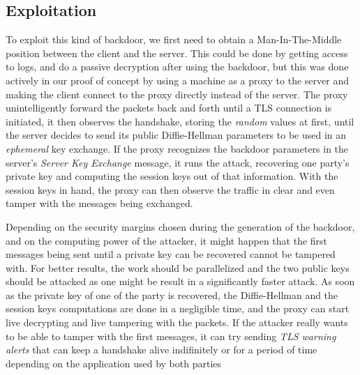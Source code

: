 \documentclass[a4paper,11pt,twocolumn]{article}
\begin{document}

\subsection{Exploitation}

To exploit this kind of backdoor, we first need to obtain a Man-In-The-Middle position between the client and the server. This could be done by getting access to logs, and do a passive decryption after using the backdoor, but this was done actively in our proof of concept by using a machine as a proxy to the server and making the client connect to the proxy directly instead of the server. The proxy unintelligently forward the packets back and forth until a TLS connection is initiated, it then observes the handshake, storing the \emph{random} values at first, until the server decides to send its public Diffie-Hellman parameters to be used in an \emph{ephemeral} key exchange. If the proxy recognizes the backdoor parameters in the server's \emph{Server Key Exchange} message, it runs the attack, recovering one party's private key and computing the session keys out of that information. With the session keys in hand, the proxy can then observe the traffic in clear and even tamper with the messages being exchanged.

Depending on the security margins chosen during the generation of the backdoor, and on the computing power of the attacker, it might happen that the first messages being sent until a private key can be recovered cannot be tampered with. For better results, the work should be parallelized and the two public keys should be attacked as one might be result in a significantly faster attack. As soon as the private key of one of the party is recovered, the Diffie-Hellman and the session keys computations are done in a negligible time, and the proxy can start live decrypting and live tampering with the packets. If the attacker really wants to be able to tamper with the first messages, it can try sending \emph{TLS warning alerts} that can keep a handshake alive indifinitely or for a period of time depending on the application used by both parties
\end{document}
